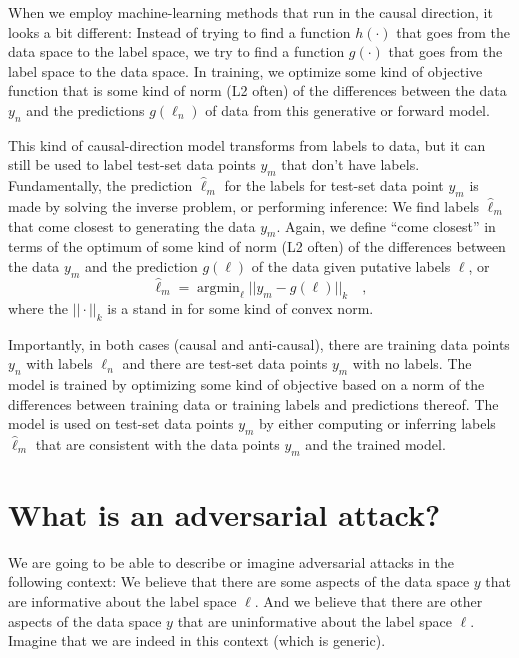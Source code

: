\documentclass[12pt, letterpaper]{article}
\DeclareMathOperator{\argmin}{argmin} %
\begin{document}
When we employ machine-learning methods that run in the causal
direction, it looks a bit different:
Instead of trying to find a function $h(\cdot)$ that goes from the
data space to the label space, we try to find a function $g(\cdot)$
that goes from the label space to the data space.
In training, we optimize some kind of objective function
that is some kind of norm (L2 often) of the differences
between the data $y_n$ and the predictions $g(\ell_n)$ of data
from this generative or forward model.

This kind of causal-direction model transforms from labels to data,
but it can still be used to label test-set data points $y_m$ that
don't have labels.
Fundamentally, the prediction $\hat{\ell}_m$ for the labels for test-set
data point $y_m$ is made by solving the inverse problem, or performing
inference:
We find labels $\hat{\ell}_m$ that come closest to generating the data
$y_m$.
Again, we define ``come closest'' in terms of the optimum of some kind
of norm (L2 often) of the differences between the data $y_m$ and the
prediction $g(\ell)$ of the data given putative labels $\ell$, or
\begin{equation}
\hat{\ell}_m = \argmin_{\ell} ||y_m - g(\ell)||_k
\quad ,
\end{equation}
where the $||\cdot||_k$ is a stand in for some kind of convex norm.

Importantly, in both cases (causal and anti-causal), there are training
data points $y_n$ with labels $\ell_n$ and there are test-set data points
$y_m$ with no labels.
The model is trained by optimizing some kind of objective based on a
norm of the differences between training data or training labels and
predictions thereof.
The model is used on test-set data points $y_m$ by either computing or
inferring labels $\hat{\ell}_m$ that are consistent with the data
points $y_m$ and the trained model.

\section{What is an adversarial attack?}

We are going to be able to describe or imagine adversarial attacks in the
following context:
We believe that there are some aspects of the data space $y$ that are
informative about the label space $\ell$.
And we believe that there are other aspects of the data space $y$ that
are uninformative about the label space $\ell$.
Imagine that we are indeed in this context (which is generic).
\end{document}
